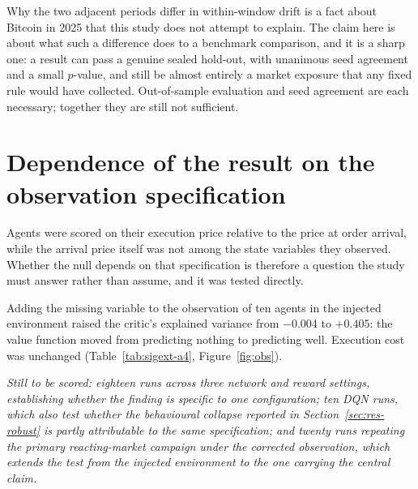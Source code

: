 Why the two adjacent periods differ in within-window drift is a fact about Bitcoin in 2025
that this study does not attempt to explain. The claim here is about what such a difference
does to a benchmark comparison, and it is a sharp one: a result can pass a genuine sealed
hold-out, with unanimous seed agreement and a small $p$-value, and still be almost entirely a
market exposure that any fixed rule would have collected. Out-of-sample evaluation and seed
agreement are each necessary; together they are still not sufficient.

\section{Dependence of the result on the observation specification}\label{sec:res-obs}


Agents were scored on their execution price relative to the price at order arrival, while the
arrival price itself was not among the state variables they observed. Whether the null
depends on that specification is therefore a question the study must answer rather than
assume, and it was tested directly.

Adding the missing variable to the observation of ten agents in the injected environment
raised the critic's explained variance from $-0.004$ to $+0.405$: the value function moved
from predicting nothing to predicting well. Execution cost was unchanged
(Table~\ref{tab:sigext-a4}, Figure~\ref{fig:obs}).

\emph{Still to be scored: eighteen runs across three network and reward settings,
establishing whether the finding is specific to one configuration; ten DQN runs, which also
test whether the behavioural collapse reported in
Section~\ref{sec:res-robust} is partly attributable to the same specification; and twenty
runs repeating the primary reacting-market campaign under the corrected observation, which
extends the test from the injected environment to the one carrying the central claim.}


